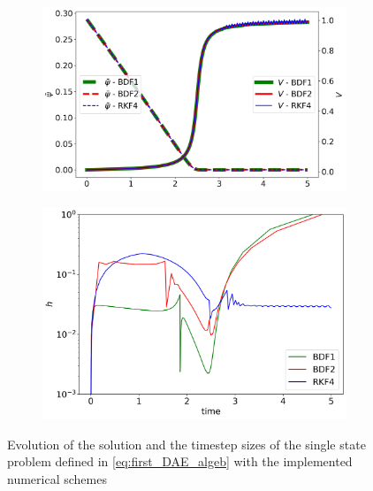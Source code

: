 \begin{figure}[H]
    \centering
    \begin{subfigure}{0.43\textwidth}
    	\centering
    	\includegraphics[width=1\textwidth]{images/timeEvolutionValues.png}
        \label{fig:timeEvolutionValues}
    \end{subfigure}
    \begin{subfigure}{0.43\textwidth}
    	\centering
    	\includegraphics[width=1\textwidth]{images/timeEvolutionDT.png}
        \label{fig:timeEvolutionDT}
    \end{subfigure}
    \caption{Evolution of the solution and the timestep sizes of the single state problem defined in \autoref{eq:first_DAE_algeb} with the implemented numerical schemes}
\end{figure}
 
